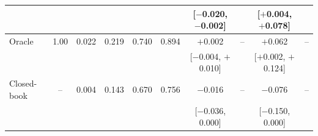 \documentclass[preprint,12pt]{elsarticle}
\begin{document}
\begin{table}[!tbp]
{\begin{tabular}{@{}lccccccccc@{}}
 &  &  &  &  &  & {\scriptsize[$-$0.020, $-$0.002]} &  & {\scriptsize[$+$0.004, $+$0.078]} &  \\[1pt]
\midrule
Oracle & 1.00 & 0.022 & 0.219 & 0.740 & 0.894 & $+$0.002 & -- & $+$0.062 & -- \\
 &  &  &  &  &  & {\scriptsize[$-$0.004, $+$0.010]} &  & {\scriptsize[$+$0.002, $+$0.124]} &  \\[1pt]
Closed-book & -- & 0.004 & 0.143 & 0.670 & 0.756 & $-$0.016 & -- & $-$0.076 & -- \\
 &  &  &  &  &  & {\scriptsize[$-$0.036, 0.000]} &  & {\scriptsize[$-$0.150, 0.000]} &  \\[1pt]
\bottomrule
\end{tabular}}
\end{table}

\begin{table}[!tbp]
\centering
\caption{Decomposition (Eq.~\ref{eq:decomp}) of paired differences in exact
match and judge accuracy into access and use terms, five generators pooled,
with question-level cluster-bootstrap 95\% intervals. For +KG the access term
is zero by construction.}
\label{tab:decomp}
\footnotesize
\setlength{\tabcolsep}{4pt}
\end{table}
\end{document}
